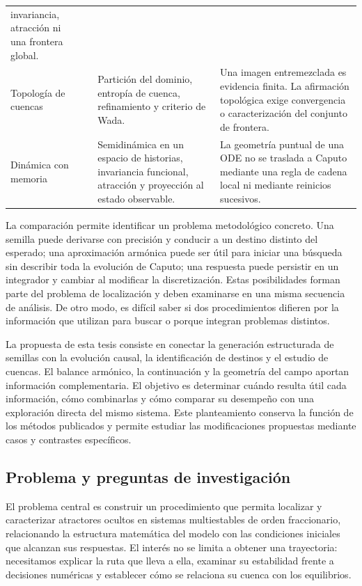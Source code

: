 \begin{longtable}{@{}L{0.16\textwidth}L{0.22\textwidth}L{0.28\textwidth}L{0.26\textwidth}@{}}
invariancia, atracción ni una frontera global. \\
Topología de cuencas
& \cite{DazaEtAl2016BasinEntropy,DazaEtAl2015Wada}
& Partición del dominio, entropía de cuenca, refinamiento y criterio de Wada.
& Una imagen entremezclada es evidencia finita. La afirmación topológica exige
convergencia o caracterización del conjunto de frontera. \\
Dinámica con memoria
& \cite{DoanKloeden2024Attractors}
& Semidinámica en un espacio de historias, invariancia funcional, atracción y
proyección al estado observable.
& La geometría puntual de una ODE no se traslada a Caputo mediante una regla de
cadena local ni mediante reinicios sucesivos. \\
\bottomrule
\end{longtable}

La comparación permite identificar un problema metodológico concreto.
Una semilla puede derivarse con precisión y conducir a un destino distinto
del esperado; una aproximación armónica puede ser útil para iniciar una
búsqueda sin describir toda la evolución de Caputo; una respuesta puede
persistir en un integrador y cambiar al modificar la discretización. Estas
posibilidades forman parte del problema de localización y deben examinarse
en una misma secuencia de análisis. De otro modo, es difícil saber si dos
procedimientos difieren por la información que utilizan para buscar o
porque integran problemas distintos.

La propuesta de esta tesis consiste en conectar la generación estructurada
de semillas con la evolución causal, la identificación de destinos y el
estudio de cuencas. El balance armónico, la continuación y la geometría
del campo aportan información complementaria. El objetivo es determinar
cuándo resulta útil cada información, cómo combinarlas y cómo comparar
su desempeño con una exploración directa del mismo sistema. Este
planteamiento conserva la función de los métodos publicados y permite
estudiar las modificaciones propuestas mediante casos y contrastes
específicos.

\subsection{Problema y preguntas de investigación}
\label{sec:cap1-problema}

El problema central es construir un procedimiento que permita localizar
y caracterizar atractores ocultos en sistemas multiestables de orden
fraccionario, relacionando la estructura matemática del modelo con las
condiciones iniciales que alcanzan sus respuestas. El interés no se limita
a obtener una trayectoria: necesitamos explicar la ruta que lleva a ella,
examinar su estabilidad frente a decisiones numéricas y establecer cómo
se relaciona su cuenca con los equilibrios.

